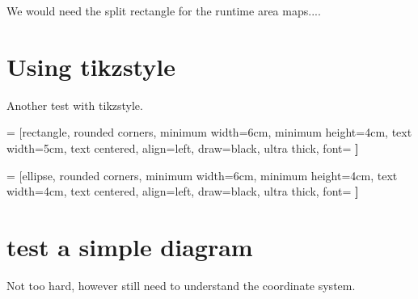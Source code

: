 We would need the split rectangle for the runtime area maps....


\section{Using tikzstyle}

Another test with tikzstyle.


 = [rectangle, 
                                rounded corners, 
                                minimum width=6cm, 
                                minimum height=4cm,
                                text width=5cm,
                                text centered,
                                align=left,
                                draw=black,
                                ultra thick,
                                font=\bfseries\large
                                ]

 =         [ellipse, 
                                rounded corners, 
                                minimum width=6cm, 
                                minimum height=4cm,
                                text width=4cm,
                                text centered,
                                align=left,
                                draw=black,
                                ultra thick,
                                font=\bfseries\large
                                ]




\section{test a simple diagram}

Not too hard, however still need to understand the coordinate system.

